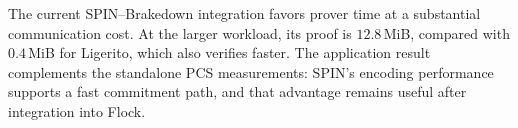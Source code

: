 The current SPIN--Brakedown integration favors prover time at a substantial
communication cost. At the larger workload, its proof is $12.8$\,MiB,
compared with $0.4$\,MiB for Ligerito, which also verifies faster.
The application result complements the standalone PCS measurements:
SPIN's encoding performance supports a fast commitment path, and that
advantage remains useful after integration into Flock.
